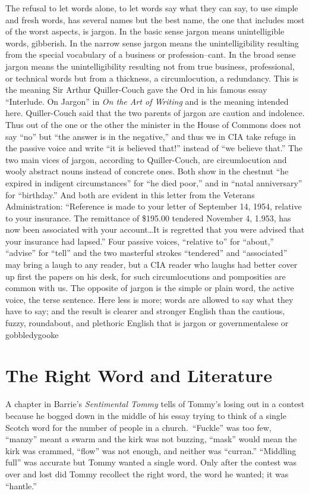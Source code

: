 \documentclass[
    oneside,
    11pt,
    draft
]{memoir}
\begin{document}
The refusal to let words alone, to let words say what they can say, to use simple and fresh words, has several names but the best name, the one that includes most of the worst aspects, is jargon. In the basic sense jargon means unintelligible words, gibberish. In the narrow sense jargon means the unintelligibility resulting from the special vocabulary of a business or profession--cant. In the broad sense jargon means the unintelligibility resulting not from true business, professional, or technical words but from a thickness, a circumlocution, a redundancy. This is the meaning Sir Arthur Quiller-Couch gave the Ord in his famous essay \enquote{Interlude. On Jargon} in \emph{On the Art of Writing} and is the meaning intended here. Quiller-Couch said that the two parents of jargon are caution and indolence. Thus out of the one or the other the minister in the House of Commons does not say \enquote{no} but \enquote{the answer is in the negative,} and thus we in CIA take refuge in the passive voice and write \enquote{it is believed that!} instead of \enquote{we believe that.} The two main vices of jargon, according to Quiller-Couch, are circumlocution and wooly abstract nouns instead of concrete ones. Both show in the chestnut \enquote{he expired in indigent circumstances} for \enquote{he died poor,} and in \enquote{natal anniversary} for \enquote{birthday.} And both are evident in this letter from the Veterans Administration: \enquote{Reference is made to your letter of September 14, 1954, relative to your insurance. The remittance of \$195.00 tendered November 4, 1.953, has now been associated with your account\dots It is regretted that you were advised that your insurance had lapsed.} Four passive voices, \enquote{relative to} for \enquote{about,} \enquote{advise} for \enquote{tell} and the two masterful strokes \enquote{tendered} and \enquote{associated} may bring a laugh to any reader, but a CIA reader who laughs had better cover up first the papers on his desk, for such circumlocutions and pomposities are common with us. The opposite of jargon is the simple or plain word, the active voice, the terse sentence. Here less is more; words are allowed to say what they have to say; and the result is clearer and stronger English than the cautious, fuzzy, roundabout, and plethoric English that is jargon or governmentalese or gobbledygooke

\chapter{The Right Word and Literature}
A chapter in Barrie's \emph{Sentimental Tommy} tells of Tommy's losing out in a contest because he bogged down in the middle of his essay trying to think of a single Scotch word for the number of people in a church.\ \enquote{Fuckle} was too few, \enquote{manzy} meant a swarm and the kirk was not buzzing, \enquote{mask} would mean the kirk was crammed, \enquote{flow} was not enough, and neither was \enquote{curran.} \enquote{Middling full} was accurate but Tommy wanted a single word. Only after the contest was over and lost did Tommy recollect the right word, the word he wanted; it was \enquote{hantle.}
\end{document}
